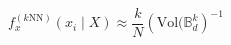 \begin{equation}
\label{eq:ad_knn}
f_{x}^{(k\text{NN})}(x_i\mid X) \approx \frac{k}{N}\left(\text{Vol}(\mathbb{B}_d^k\right)^{-1}
\end{equation}
